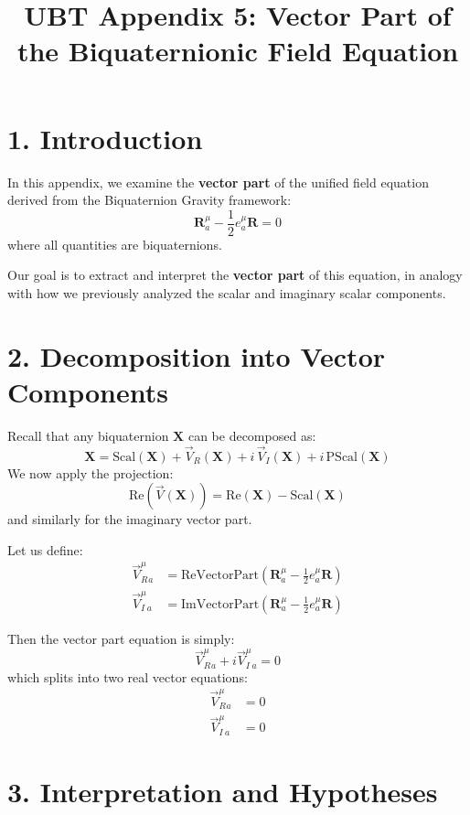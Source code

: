 \documentclass[12pt]{article}
\title{UBT Appendix 5: Vector Part of the Biquaternionic Field Equation}
\author{}
\date{}
\begin{document}
\maketitle

\section*{1. Introduction}

In this appendix, we examine the \textbf{vector part} of the unified field equation derived from the Biquaternion Gravity framework:
\begin{equation}
\mathbf{R}^\mu_a - \frac{1}{2} e^\mu_a \mathbf{R} = 0
\end{equation}
where all quantities are biquaternions.

Our goal is to extract and interpret the \textbf{vector part} of this equation, in analogy with how we previously analyzed the scalar and imaginary scalar components.

\section*{2. Decomposition into Vector Components}

Recall that any biquaternion $\mathbf{X}$ can be decomposed as:
\[
\mathbf{X} = \text{Scal}(\mathbf{X}) + \vec{V}_R(\mathbf{X}) + i \, \vec{V}_I(\mathbf{X}) + i \, \text{PScal}(\mathbf{X})
\]
We now apply the projection:
\[
\text{Re}(\vec{V}(\mathbf{X})) = \text{Re}(\mathbf{X}) - \text{Scal}(\mathbf{X})
\]
and similarly for the imaginary vector part.

Let us define:
\begin{align}
\vec{V}_R^\mu_a &= \text{ReVectorPart}(\mathbf{R}^\mu_a - \tfrac{1}{2} e^\mu_a \mathbf{R}) \\
\vec{V}_I^\mu_a &= \text{ImVectorPart}(\mathbf{R}^\mu_a - \tfrac{1}{2} e^\mu_a \mathbf{R})
\end{align}

Then the vector part equation is simply:
\begin{equation}
\vec{V}_R^\mu_a + i \vec{V}_I^\mu_a = 0
\end{equation}
which splits into two real vector equations:
\begin{align}
\vec{V}_R^\mu_a &= 0 \\
\vec{V}_I^\mu_a &= 0
\end{align}

\section*{3. Interpretation and Hypotheses}
\end{document}
